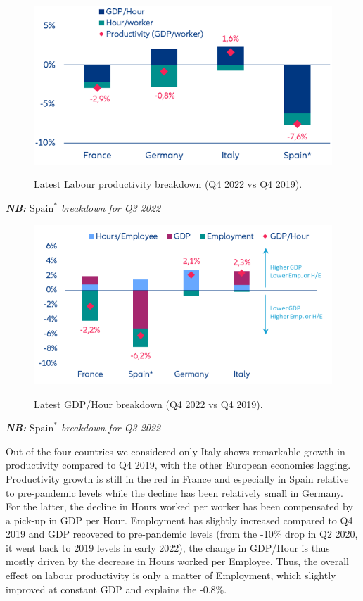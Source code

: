 \begin{figure}[H]
    \centering
    \caption{Latest Labour productivity breakdown (Q4 2022 vs Q4 2019).}
    \includegraphics[width=.6\textwidth]{Core/2.Labour/img/prodbreakdown1.png}
    \label{figure:prodbreakdown1}
\end{figure}
\vspace{-.5cm}
\quad \quad \quad \textit{\textbf{NB:} $\textrm{Spain}^{*}$ breakdown for Q3 2022}
\begin{figure}[H]
    \centering
    \caption{Latest GDP/Hour breakdown (Q4 2022 vs Q4 2019).}
    \includegraphics[width=.6\textwidth]{Core/2.Labour/img/prodbreakdown2.png}
    \label{figure:prodbreakdown2}
\end{figure}
\vspace{-.5cm}
\quad \quad \quad \textit{\textbf{NB:} $\textrm{Spain}^{*}$ breakdown for Q3 2022}

Out of the four countries we considered only Italy shows remarkable growth in productivity compared to Q4 2019, with the other European economies lagging. 
Productivity growth is still in the red in France and especially in Spain relative to pre-pandemic levels while the decline has been relatively small in Germany. 
For the latter, the decline in Hours worked per worker has been compensated by a pick-up in GDP per Hour. 
Employment has slightly increased compared to Q4 2019 and GDP recovered to pre-pandemic levels (from the -10\% drop in Q2 2020, it went back to 2019 levels in early 2022), the change in GDP/Hour is thus mostly driven by the decrease in Hours worked per Employee. 
Thus, the overall effect on labour productivity is only a matter of Employment, which slightly improved at constant GDP and explains the -0.8\%.

